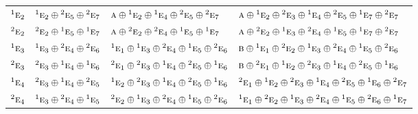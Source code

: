 \documentclass[10pt,a4paper]{article}
\numberwithin{equation}{section}
\newcommand{\irr}[1]{\text{\normalfont\scshape #1}}
\newcommand{\conjpair}[1]{{}^{#1}}
\begin{document}
{\begin{longtable}{@{}llll@{}}
$\conjpair{1}\irr{e}_{2}$ & $\conjpair{1}\irr{e}_{2}\oplus \conjpair{2}\irr{e}_{5}\oplus \conjpair{2}\irr{e}_{7}$ & $\irr{a}\oplus \conjpair{1}\irr{e}_{2}\oplus \conjpair{1}\irr{e}_{4}\oplus \conjpair{2}\irr{e}_{5}\oplus \conjpair{2}\irr{e}_{7}$ & $\irr{a}\oplus \conjpair{1}\irr{e}_{2}\oplus \conjpair{2}\irr{e}_{3}\oplus \conjpair{1}\irr{e}_{4}\oplus \conjpair{2}\irr{e}_{5}\oplus \conjpair{1}\irr{e}_{7}\oplus \conjpair{2}\irr{e}_{7}$\\
$\conjpair{2}\irr{e}_{2}$ & $\conjpair{2}\irr{e}_{2}\oplus \conjpair{1}\irr{e}_{5}\oplus \conjpair{1}\irr{e}_{7}$ & $\irr{a}\oplus \conjpair{2}\irr{e}_{2}\oplus \conjpair{2}\irr{e}_{4}\oplus \conjpair{1}\irr{e}_{5}\oplus \conjpair{1}\irr{e}_{7}$ & $\irr{a}\oplus \conjpair{2}\irr{e}_{2}\oplus \conjpair{1}\irr{e}_{3}\oplus \conjpair{2}\irr{e}_{4}\oplus \conjpair{1}\irr{e}_{5}\oplus \conjpair{1}\irr{e}_{7}\oplus \conjpair{2}\irr{e}_{7}$\\
$\conjpair{1}\irr{e}_{3}$ & $\conjpair{1}\irr{e}_{3}\oplus \conjpair{2}\irr{e}_{4}\oplus \conjpair{2}\irr{e}_{6}$ & $\conjpair{1}\irr{e}_{1}\oplus \conjpair{1}\irr{e}_{3}\oplus \conjpair{2}\irr{e}_{4}\oplus \conjpair{1}\irr{e}_{5}\oplus \conjpair{2}\irr{e}_{6}$ & $\irr{b}\oplus \conjpair{1}\irr{e}_{1}\oplus \conjpair{2}\irr{e}_{2}\oplus \conjpair{1}\irr{e}_{3}\oplus \conjpair{2}\irr{e}_{4}\oplus \conjpair{1}\irr{e}_{5}\oplus \conjpair{2}\irr{e}_{6}$\\
$\conjpair{2}\irr{e}_{3}$ & $\conjpair{2}\irr{e}_{3}\oplus \conjpair{1}\irr{e}_{4}\oplus \conjpair{1}\irr{e}_{6}$ & $\conjpair{2}\irr{e}_{1}\oplus \conjpair{2}\irr{e}_{3}\oplus \conjpair{1}\irr{e}_{4}\oplus \conjpair{2}\irr{e}_{5}\oplus \conjpair{1}\irr{e}_{6}$ & $\irr{b}\oplus \conjpair{2}\irr{e}_{1}\oplus \conjpair{1}\irr{e}_{2}\oplus \conjpair{2}\irr{e}_{3}\oplus \conjpair{1}\irr{e}_{4}\oplus \conjpair{2}\irr{e}_{5}\oplus \conjpair{1}\irr{e}_{6}$\\
$\conjpair{1}\irr{e}_{4}$ & $\conjpair{2}\irr{e}_{3}\oplus \conjpair{1}\irr{e}_{4}\oplus \conjpair{2}\irr{e}_{5}$ & $\conjpair{1}\irr{e}_{2}\oplus \conjpair{2}\irr{e}_{3}\oplus \conjpair{1}\irr{e}_{4}\oplus \conjpair{2}\irr{e}_{5}\oplus \conjpair{1}\irr{e}_{6}$ & $\conjpair{2}\irr{e}_{1}\oplus \conjpair{1}\irr{e}_{2}\oplus \conjpair{2}\irr{e}_{3}\oplus \conjpair{1}\irr{e}_{4}\oplus \conjpair{2}\irr{e}_{5}\oplus \conjpair{1}\irr{e}_{6}\oplus \conjpair{2}\irr{e}_{7}$\\
$\conjpair{2}\irr{e}_{4}$ & $\conjpair{1}\irr{e}_{3}\oplus \conjpair{2}\irr{e}_{4}\oplus \conjpair{1}\irr{e}_{5}$ & $\conjpair{2}\irr{e}_{2}\oplus \conjpair{1}\irr{e}_{3}\oplus \conjpair{2}\irr{e}_{4}\oplus \conjpair{1}\irr{e}_{5}\oplus \conjpair{2}\irr{e}_{6}$ & $\conjpair{1}\irr{e}_{1}\oplus \conjpair{2}\irr{e}_{2}\oplus \conjpair{1}\irr{e}_{3}\oplus \conjpair{2}\irr{e}_{4}\oplus \conjpair{1}\irr{e}_{5}\oplus \conjpair{2}\irr{e}_{6}\oplus \conjpair{1}\irr{e}_{7}$\\

\end{longtable}}
\end{document}

